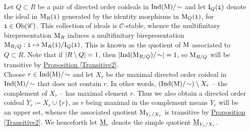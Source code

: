 \noindent Let $Q \subset R$ be a pair of directed order coideals in $\textnormal{Ind}(\textnormal{M})/\!\sim$ and let $\textnormal{I}_Q(\textnormal{\texttt{i}})$ denote the ideal in $\textnormal{M}_R(\textnormal{\texttt{i}})$ generated by the identity morphisms in $\textnormal{M}_Q(\textnormal{\texttt{i}})$, for $\textnormal{\texttt{i}} \in \textnormal{Ob}(\mathscr{C})$. This collection of ideals is $\mathscr{C}$-stable, whence the multifinitary birepresentation $\textnormal{M}_R$ induces a multifinitary birepresentation $\textnormal{M}_{R/Q} : \textnormal{\texttt{i}} \mapsto \textnormal{M}_R(\textnormal{\texttt{i}})/\textnormal{I}_Q(\textnormal{\texttt{i}})$. This is known as the quotient of $\textnormal{M}$ associated to $Q \subset R$. Note that if $\lvert R \setminus Q\rvert = 1$, then $\lvert\textnormal{Ind}(\textnormal{M}_{R/Q})/\!\sim\rvert = 1$, so $\textnormal{M}_{R/Q}$ will be transitive by \hyperref[Transitive2]{Proposition \ref*{Transitive2}}.\\

\noindent Choose $r \in \textnormal{Ind}(\textnormal{M})/\!\sim$ and let $X_r$ be the maximal directed order coideal in $\textnormal{Ind}(\textnormal{M})/\!\sim$ that does not contain $r$. In other words, $(\textnormal{Ind}(\textnormal{M})/\!\sim)\setminus X_r$ -- the complement of $X_r$ -- has maximal element $r$. %
Thus we also obtain a directed order coideal $Y_r \coloneqq X_r \cup \{r\}$, as $r$ being maximal in the complement means $Y_r$ will be an upper set, whence the associated quotient $\textnormal{M}_{Y_r/X_r}$ is transitive by \hyperref[Transitive2]{Proposition \ref*{Transitive2}}. We henceforth let $\underline{\textnormal{M}}_r$ denote the simple quotient $\underline{\textnormal{M}}_{Y_r/X_r}$.\newpage


